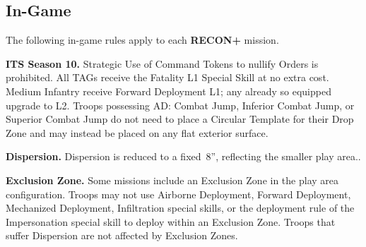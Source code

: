 \documentclass[14pt,dvipsnames]{extarticle}
\newcommand{\missionrule}[1]{\noindent\textbf{#1}\xspace}
\newcommand{\reconplus}{\textbf{RECON+}\xspace}
\begin{document}
\vspace{-7pt}
\subsection{In-Game}

The following in-game rules apply to each \reconplus mission.

\vspace{-7pt} \missionrule{ITS Season 10.} Strategic Use of Command
Tokens to nullify Orders is prohibited.  All TAGs receive the Fatality
L1 Special Skill at no extra cost.  Medium Infantry receive Forward
Deployment L1; any already so equipped upgrade to L2.  Troops
possessing AD: Combat Jump, Inferior Combat Jump, or Superior Combat
Jump do not need to place a Circular Template for their Drop Zone and
may instead be placed on any flat exterior surface.



  

\vspace{-7pt}%
\missionrule{Dispersion.} Dispersion is reduced to a fixed~8'',
reflecting the smaller play area..

\vspace{-7pt}
\missionrule{Exclusion Zone.}  Some missions include an Exclusion Zone
in the play area configuration.  Troops may not use Airborne
Deployment, Forward Deployment, Mechanized Deployment, Infiltration
special skills, or the deployment rule of the Impersonation special
skill to deploy within an Exclusion Zone.  Troops that suffer
Dispersion are not affected by Exclusion Zones.

\end{document}
